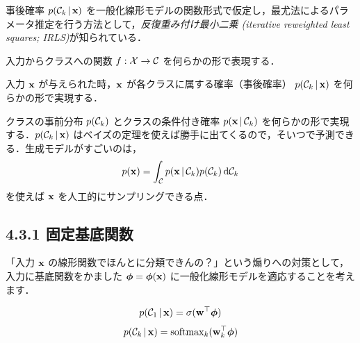事後確率 $p({\mathcal{C}}_k \,|\, {\mathbf{x}})$ を一般化線形モデルの関数形式で仮定し，最尤法によるパラメータ推定を行う方法として，\emph{反復重み付け最小二乗 (iterative reweighted least squares; IRLS)}が知られている．

\begin{embedbox}
\begin{description}[style=nextline]
  \item[識別モデル] 入力からクラスへの関数 $f: {\mathcal{X}} \to {\mathcal{C}}$ を何らかの形で表現する．
  \item[確率的識別モデル] 入力 ${\mathbf{x}}$ が与えられた時，${\mathbf{x}}$ が各クラスに属する確率（事後確率） $p({\mathcal{C}}_k \,|\, {\mathbf{x}})$ を何らかの形で実現する．
  \item[生成モデル] クラスの事前分布 $p({\mathcal{C}}_k)$ とクラスの条件付き確率 $p({\mathbf{x}} \,|\, {\mathcal{C}}_k)$ を何らかの形で実現する．$p({\mathcal{C}}_k \,|\, {\mathbf{x}})$ はベイズの定理を使えば勝手に出てくるので，そいつで予測できる．生成モデルがすごいのは，
  \[
    p({\mathbf{x}}) = \int_{\mathcal{C}} p({\mathbf{x}} \,|\, {\mathcal{C}}_k) p({\mathcal{C}}_k) \mathop{}\!\mathrm{d}{{\mathcal{C}}_k}
  \]
  を使えば ${\mathbf{x}}$ を人工的にサンプリングできる点．
\end{description}
\end{embedbox}

\subsection*{4.3.1 固定基底関数}

「入力 ${\mathbf{x}}$ の線形関数でほんとに分類できんの？」という煽りへの対策として，入力に基底関数をかました $\boldsymbol{\phi} = \boldsymbol{\phi}({\mathbf{x}})$ に一般化線形モデルを適応することを考えます．

\[
  p({\mathcal{C}}_1 \,|\, {\mathbf{x}}) = \sigma({\mathbf{w}}^\top \boldsymbol{\phi}) 
\]
\[
  p({\mathcal{C}}_k \,|\, {\mathbf{x}}) = \mathrm{softmax}_k({\mathbf{w}}_k^\top \boldsymbol{\phi})
\]

